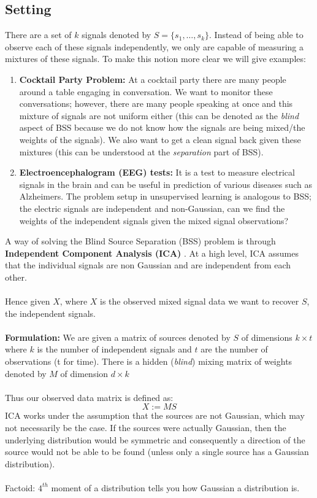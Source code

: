 \subsection{Setting}

There are a set of $k$ signals denoted by $S = \{ s_1, \dots, s_k\}$. Instead of being able to observe 
each of these signals independently, we only are capable of measuring a mixtures of these signals. To make
this notion more clear we will give examples: 
\begin{enumerate}
    \item \textbf{Cocktail Party Problem:} At a cocktail party there are many people around a table
    engaging in conversation. We want to monitor these conversations; however, there are many people
    speaking at once and this mixture of signals are not uniform either (this can be denoted as the
    \textit{blind} aspect of BSS because we do not know how the signals are being mixed/the weights of the
    signals). We also want to get a clean signal back given these mixtures (this can be understood at the
    \textit{separation} part of BSS).  
    \item \textbf{Electroencephalogram (EEG) tests:} It is a test to measure electrical signals in the brain and can be useful in prediction of various diseases such as Alzheimers. The problem setup in unsupervised learning is analogous to BSS; the electric signals are independent and non-Gaussian, can we find the weights of the independent signals given the mixed signal observations? 
\end{enumerate}
A way of solving the Blind Source Separation (BSS) problem is through \textbf{Independent Component Analysis (ICA) }. At a high level, ICA assumes that the individual signals are non Gaussian and are independent from each other. \\ \\
Hence given $X$, where $X$ is the observed mixed signal data we want to recover $S$, the independent signals. \\ \\
\textbf{Formulation: } We are given a matrix of sources denoted by $S$ of dimensions $k \times t$ where $k$ is the number of independent signals and $t$ are the number of observations (t for time). There is a hidden (\textit{blind}) mixing matrix of weights denoted by $M$ of dimension $d \times k$ \\ \\ 
Thus our observed data matrix is defined as: \[ X := MS \]
ICA works under the assumption that the sources are not Gaussian, which may not necessarily be the case. If the sources were actually Gaussian, then the underlying distribution would be symmetric and consequently a direction of the source would not be able to be found (unless only a single source has a Gaussian distribution).  \\ \\
Factoid: $4^{th}$ moment of a distribution tells you how Gaussian a distribution is. 